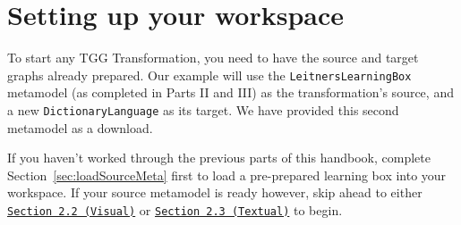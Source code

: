 \newpage
\section{Setting up your workspace}
\genHeader

To start any TGG Transformation, you need to have the source and target graphs already prepared. Our example will use the \texttt{LeitnersLearningBox}
metamodel (as completed in Parts II and III) as the transformation's source, and a new \texttt{DictionaryLanguage} as its target. We have provided this
second metamodel as a download.

If you haven't worked through the previous parts of this handbook, complete Section~\ref{sec:loadSourceMeta} first to load a pre-prepared learning box into your
workspace. If your source metamodel is ready however, skip ahead to either \texttt{\hyperlink{sec:multiEAP}{Section 2.2 (Visual)}} or
\texttt{\hyperlink{sec:multiMOSL}{Section 2.3 (Textual)}} to begin.








